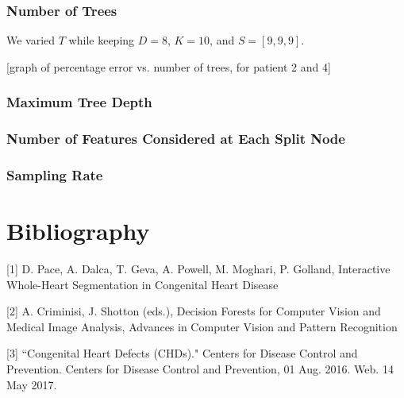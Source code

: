 \subsubsection{Number of Trees} We varied $T$ while keeping $D=8$, $K=10$, and $S=[9,9,9]$.

[graph of percentage error vs. number of trees, for patient 2 and 4]
\subsubsection{Maximum Tree Depth}
\subsubsection{Number of Features Considered at Each Split Node}
\subsubsection{Sampling Rate}


\section{Bibliography}
[1] D. Pace, A. Dalca, T. Geva, A. Powell, M. Moghari, P. Golland, Interactive Whole-Heart Segmentation in Congenital Heart Disease

[2] A. Criminisi, J. Shotton (eds.), Decision Forests for Computer Vision and Medical Image Analysis, Advances in Computer Vision and Pattern Recognition

[3] ``Congenital Heart Defects (CHDs)." Centers for Disease Control and Prevention. Centers for Disease Control and Prevention, 01 Aug. 2016. Web. 14 May 2017.

